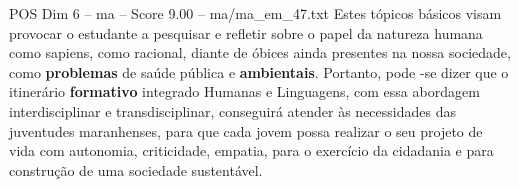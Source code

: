 \begin{textsample}{POS Dim 6 – ma – Score 9.00 – ma/ma\_em\_47.txt}
Estes tópicos básicos visam provocar o estudante a pesquisar e refletir sobre o papel da natureza humana como sapiens, como racional, diante de óbices ainda presentes na nossa sociedade, como \textbf{problemas} de saúde pública e \textbf{ambientais}.
Portanto, pode -se dizer que o itinerário \textbf{formativo} integrado Humanas e Linguagens, com essa abordagem interdisciplinar e transdisciplinar, conseguirá atender às necessidades das juventudes maranhenses, para que cada jovem possa realizar o seu projeto de vida com autonomia, criticidade, empatia, para o exercício da cidadania e para construção de uma sociedade sustentável.

\end{textsample}
